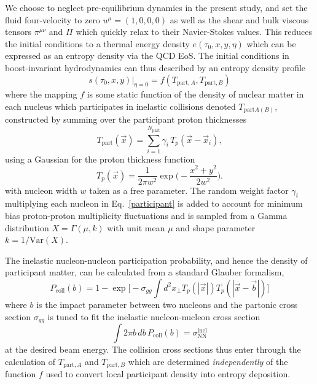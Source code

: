 \documentclass[aps,prc,reprint,amsmath,nofootinbib]{revtex4-1}
\newcommand{\TA}{T_{\text{part},A}}
\newcommand{\TB}{T_{\text{part},B}}
\begin{document}
We choose to neglect pre-equilibrium dynamics in the present study, and set the fluid four-velocity to zero ${u^\mu = (1,0,0,0)}$ as well as the shear and bulk viscous tensors $\pi^{\mu\nu}$ and $\Pi$ which quickly relax to their Navier-Stokes values. This reduces the initial conditions to a thermal energy density $e(\tau_0, x, y, \eta)$ which can be expressed as an entropy density via the QCD EoS. The initial conditions in boost-invariant hydrodynamics can thus described by an entropy density profile
\begin{equation}
    \label{mapping}
    s(\tau_0, x, y)\vert_{\eta=0} = f(\TA, \TB)
\end{equation}
where the mapping $f$ is some static function of the density of nuclear matter in each nucleus which participates in inelastic collisions denoted $T_{\text{part}A(B)}$, constructed by summing over the participant proton thicknesses
\begin{equation}
    \label{participant}
    T_{\text{part}}(\vec{x}) = \sum\limits_{i=1}^{N_\text{part}} \gamma_i\, T_p(\vec{x} - \vec{x}_i),
\end{equation}
using a Gaussian for the proton thickness function
\begin{equation}
    T_p(\vec{x}) = \frac{1}{2\pi w^2} \exp\bigg(\!-\frac{x^2 + y^2}{2 w^2}\bigg). 
\end{equation}    
with nucleon width $w$ taken as a free parameter. The random weight factor $\gamma_i$ multiplying each nucleon in Eq.~\eqref{participant} is added to account for minimum bias proton-proton multiplicity fluctuations and is sampled from a Gamma distribution $X = \Gamma(\mu, k)$ with unit mean $\mu$ and shape parameter $k = 1/\text{Var}(X)$.

The inelastic nucleon-nucleon participation probability, and hence the density of participant matter, can be calculated from a standard Glauber formalism,
\begin{equation}
    P_\text{coll}(b) = 1 - \exp \bigg[ -\sigma_{gg} \int d^2x_\perp T_p(|\vec{x}|) T_p(|\vec{x} - \vec{b}|) \bigg ] 
\end{equation}
where $b$ is the impact parameter between two nucleons and the partonic cross section $\sigma_{gg}$ is tuned to fit the inelastic nucleon-nucleon cross section
\begin{equation}
    \int 2 \pi b\, db\, P_\text{coll}(b) = \sigma_\text{NN}^\text{inel} 
\end{equation}
at the desired beam energy. The collision cross sections thus enter through the calculation of $\TA$ and $\TB$ which are determined \emph{independently} of the function $f$ used to convert local participant density into entropy deposition.
\end{document}
